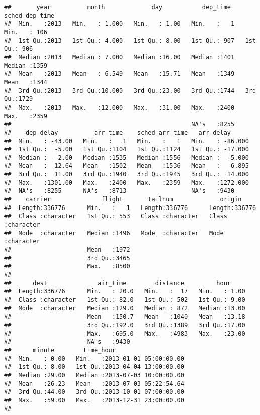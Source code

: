 \documentclass[
]{article}
\begin{document}
\begin{verbatim}
##       year          month             day           dep_time    sched_dep_time
##  Min.   :2013   Min.   : 1.000   Min.   : 1.00   Min.   :   1   Min.   : 106  
##  1st Qu.:2013   1st Qu.: 4.000   1st Qu.: 8.00   1st Qu.: 907   1st Qu.: 906  
##  Median :2013   Median : 7.000   Median :16.00   Median :1401   Median :1359  
##  Mean   :2013   Mean   : 6.549   Mean   :15.71   Mean   :1349   Mean   :1344  
##  3rd Qu.:2013   3rd Qu.:10.000   3rd Qu.:23.00   3rd Qu.:1744   3rd Qu.:1729  
##  Max.   :2013   Max.   :12.000   Max.   :31.00   Max.   :2400   Max.   :2359  
##                                                  NA's   :8255                 
##    dep_delay          arr_time    sched_arr_time   arr_delay       
##  Min.   : -43.00   Min.   :   1   Min.   :   1   Min.   : -86.000  
##  1st Qu.:  -5.00   1st Qu.:1104   1st Qu.:1124   1st Qu.: -17.000  
##  Median :  -2.00   Median :1535   Median :1556   Median :  -5.000  
##  Mean   :  12.64   Mean   :1502   Mean   :1536   Mean   :   6.895  
##  3rd Qu.:  11.00   3rd Qu.:1940   3rd Qu.:1945   3rd Qu.:  14.000  
##  Max.   :1301.00   Max.   :2400   Max.   :2359   Max.   :1272.000  
##  NA's   :8255      NA's   :8713                  NA's   :9430      
##    carrier              flight       tailnum             origin         
##  Length:336776      Min.   :   1   Length:336776      Length:336776     
##  Class :character   1st Qu.: 553   Class :character   Class :character  
##  Mode  :character   Median :1496   Mode  :character   Mode  :character  
##                     Mean   :1972                                        
##                     3rd Qu.:3465                                        
##                     Max.   :8500                                        
##                                                                         
##      dest              air_time        distance         hour      
##  Length:336776      Min.   : 20.0   Min.   :  17   Min.   : 1.00  
##  Class :character   1st Qu.: 82.0   1st Qu.: 502   1st Qu.: 9.00  
##  Mode  :character   Median :129.0   Median : 872   Median :13.00  
##                     Mean   :150.7   Mean   :1040   Mean   :13.18  
##                     3rd Qu.:192.0   3rd Qu.:1389   3rd Qu.:17.00  
##                     Max.   :695.0   Max.   :4983   Max.   :23.00  
##                     NA's   :9430                                  
##      minute        time_hour                     
##  Min.   : 0.00   Min.   :2013-01-01 05:00:00.00  
##  1st Qu.: 8.00   1st Qu.:2013-04-04 13:00:00.00  
##  Median :29.00   Median :2013-07-03 10:00:00.00  
##  Mean   :26.23   Mean   :2013-07-03 05:22:54.64  
##  3rd Qu.:44.00   3rd Qu.:2013-10-01 07:00:00.00  
##  Max.   :59.00   Max.   :2013-12-31 23:00:00.00  
## 
\end{verbatim}
\end{document}
